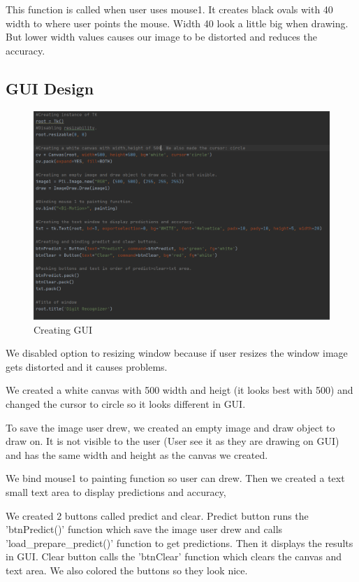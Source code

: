 \documentclass[onecolumn]{article}
\begin{document}
This function is called when user uses mouse1. It creates black ovals with 40 width to where user points the mouse. Width 40 look a little big when drawing. But lower width values causes our image to be distorted and reduces the accuracy.


\clearpage
\subsection{GUI Design}
\begin{figure}[h!]
\centering
    \includegraphics[width=0.9\linewidth]{gui.PNG}
\caption{\label{}
Creating GUI}
\end{figure}

We disabled option to resizing window because if user resizes the window image gets distorted and it causes problems.

We created a white canvas with 500 width and heigt (it looks best with 500) and changed the cursor to circle so it looks different in GUI.

To save the image user drew, we created an empty image and draw object to draw on. It is not visible to the user (User see it as they are drawing on GUI) and has the same width and height as the canvas we created.

We bind mouse1 to painting function so user can drew. Then we created a text small text area to display predictions and accuracy, 

We created 2 buttons called predict and clear. Predict button runs the 'btnPredict()' function which save the image user drew and calls 'load\_prepare\_predict()' function to get predictions. Then it displays the results in GUI. Clear button calls the 'btnClear' function which clears the canvas and text area. We also colored the buttons so they look nice.
\end{document}
